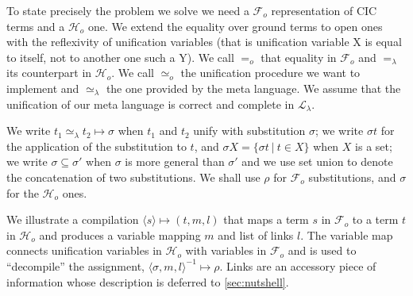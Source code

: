 \documentclass[sigconf,natbib=false,review]{acmart}
\newcommand{\EqualRel}{\ensuremath{=}}
\newcommand{\UnifRel}{\ensuremath{\simeq}}
\newcommand{\Uo}{\ensuremath{\UnifRel_o}\xspace}
\newcommand{\Eo}{\ensuremath{\EqualRel_o}\xspace}
\newcommand{\Ue}{\ensuremath{\UnifRel_\lambda}\xspace}
\newcommand{\Ee}{\ensuremath{\EqualRel_\lambda}\xspace}
\newcommand{\llambda}{\ensuremath{\mathcal{L}_\lambda}\xspace}
\newcommand{\Fo}{\ensuremath{\mathcal{F}_{\!o}\xspace}} %
\newcommand{\Ho}{\ensuremath{\mathcal{H}_o}\xspace}
\begin{document}
To state precisely the problem we solve we need a \Fo{} representation
of CIC terms and a \Ho one. We extend the equality over ground
terms to open ones with the reflexivity of unification variables (that is
unification variable X is equal to itself, not to another one such a Y).
We call \Eo that equality in \Fo{} and \Ee its counterpart in \Ho.
We call \Uo the unification procedure we want to implement and
\Ue the one provided by the meta language.
We assume that the unification of our meta
language is correct and complete in \llambda.
%

We write $t_1 \Ue t_2 \mapsto \sigma$ when $t_1$ and $t_2$ unify
with substitution $\sigma$; we write $\sigma t$ for the application of
the substitution to $t$, and $\sigma X = \{ \sigma t ~|~ t \in X\}$ when
$X$ is a set; we write $\sigma \subseteq \sigma'$ when $\sigma$ is more
general than $\sigma'$ and we use set union to denote the concatenation of
two substitutions. We shall use $\rho$ for \Fo{} substitutions, and
$\sigma$ for the \Ho ones.

\newcommand{\C}[4]{\ensuremath{\langle #1 \rangle}\mapsto(#2,#3,#4)}
\newcommand{\D}[4]{\ensuremath{\langle #1,#2,#3 \rangle^{-1}\mapsto #4}}

We illustrate a compilation $\C{s}{t}{m}{l}$ that
maps a term $s$ in \Fo{} to a term $t$ in \Ho{} and produces
a variable mapping $m$ and list of links $l$.
The variable map connects unification variables in \Ho with variables
in \Fo{} and is used to ``decompile'' the assignment,
$\D{\sigma}{m}{l}{\rho}$.
Links are an accessory piece of information whose
description is deferred to \cref{sec:nutshell}.
\end{document}
